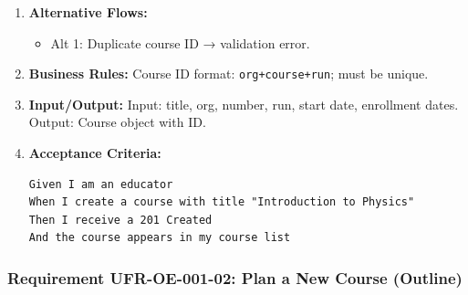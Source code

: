 \begin{enumerate}[label=\textbf{\arabic*.}]
\begin{enumerate}
    \end{enumerate}
\item \textbf{Alternative Flows:}
    \begin{itemize}
        \item Alt 1: Duplicate course ID → validation error.
    \end{itemize}
\item \textbf{Business Rules:} Course ID format: \texttt{org+course+run}; must be unique.
\item \textbf{Input/Output:} Input: title, org, number, run, start date, enrollment dates. Output: Course object with ID.
\item \textbf{Acceptance Criteria:}
    \begin{verbatim}
Given I am an educator
When I create a course with title "Introduction to Physics"
Then I receive a 201 Created
And the course appears in my course list
    \end{verbatim}
\end{enumerate}

\subsubsection{Requirement UFR-OE-001-02: Plan a New Course (Outline)}
